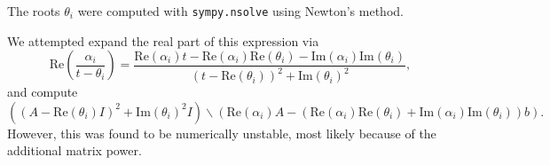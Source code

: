 The roots $\theta_i$ were computed with \texttt{sympy.nsolve} using Newton's
method.

We attempted expand the real part of this expression via
\begin{equation}
\mathrm{Re}\left(\frac{\alpha_i}{t - \theta_i}\right) = \frac{\mathrm{Re}{(\alpha_{i})}t - \mathrm{Re}{(\alpha_{i})} \mathrm{Re}{(\theta_{i})} - \mathrm{Im}{(\alpha_{i})} \mathrm{Im}{(\theta_{i})}}{\left(t - \mathrm{Re}{(\theta_{i})}\right)^{2} + \mathrm{Im}{(\theta_{i})}^{2}},
\end{equation}
and compute
\begin{equation}
\left(\left(A - \mathrm{Re}{(\theta_{i})I}\right)^{2} +
  \mathrm{Im}{(\theta_{i})}^{2}I\right)\backslash \left(\mathrm{Re}{(\alpha_{i})}A - (\mathrm{Re}{(\alpha_{i})} \mathrm{Re}{(\theta_{i})} + \mathrm{Im}{(\alpha_{i})} \mathrm{Im}{(\theta_{i})})b\right).
\end{equation}
However, this was found to be numerically unstable, most likely because of the
additional matrix power.
